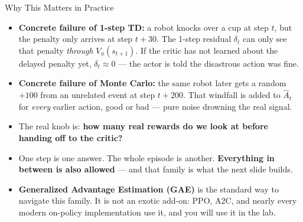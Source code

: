 \begin{frame}{Why This Matters in Practice}
\begin{itemize}
    \item \textbf{Concrete failure of 1-step TD:} a robot knocks over a cup at step $t$, but the penalty only arrives at step $t{+}30$. The 1-step residual $\delta_t$ can only see that penalty \emph{through} $V_\phi(s_{t+1})$. If the critic has not learned about the delayed penalty yet, $\delta_t \approx 0$ --- the actor is told the disastrous action was fine.
    \pause
    \item \textbf{Concrete failure of Monte Carlo:} the same robot later gets a random $+100$ from an unrelated event at step $t{+}200$. That windfall is added to $\hat{A}_t$ for \emph{every} earlier action, good or bad --- pure noise drowning the real signal.
    \pause
    \vspace{0.4em}
    \item[$\Rightarrow$] The real knob is: \textbf{how many real rewards do we look at before handing off to the critic?}
    \item One step is one answer. The whole episode is another. \textbf{Everything in between is also allowed} --- and that family is what the next slide builds.
    \item \textbf{Generalized Advantage Estimation (GAE)} is the standard way to navigate this family. It is not an exotic add-on: PPO, A2C, and nearly every modern on-policy implementation use it, and you will use it in the lab.
\end{itemize}
\end{frame}
